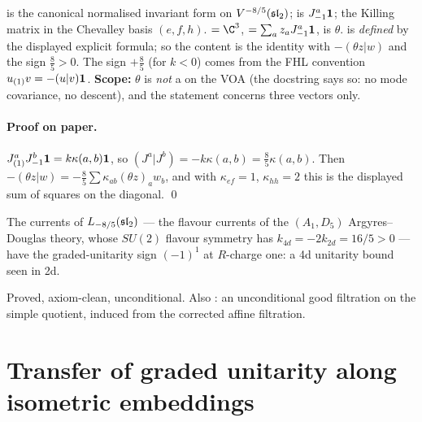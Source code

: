 \begin{dictionary}
 is the canonical normalised invariant form on $V^{-8/5}(\mathfrak{sl}_2)$;
 is $J^a_{-1}\mathbf{1}$;  the Killing matrix in the Chevalley basis
$(e,f,h)$.  $=\C^3$,  $= \sum_az_aJ^a_{-1}\mathbf{1}$,
 is $\theta$.  is \emph{defined} by the displayed
explicit formula; so the content is the identity with $-(\theta z|w)$ and the sign $\tfrac85>0$. The sign
$+\tfrac85$ (for $k<0$) comes from the FHL convention $u_{(1)}v = -(u|v)\mathbf{1}$. \textbf{Scope:} $\theta$ is
\emph{not} a  on the VOA (the docstring says so: no mode covariance, no descent), and the
statement concerns three vectors only.
\end{dictionary}

\paragraph{Proof on paper.} $J^a_{(1)}J^b_{-1}\mathbf{1} = k\kappa(a,b)\mathbf{1}$, so $(J^a|J^b) = -k\kappa(a,b) =
\tfrac85\kappa(a,b)$. Then $-(\theta z|w) = -\tfrac85\sum\kappa_{ab}(\theta z)_aw_b$, and with $\kappa_{ef} = 1$,
$\kappa_{hh} = 2$ this is the displayed sum of squares on the diagonal. \qed

\begin{physics}
The currents of $L_{-8/5}(\mathfrak{sl}_2)$ --- the flavour currents of the $(A_1,D_5)$ Argyres--Douglas theory, whose
$SU(2)$ flavour symmetry has $k_{4d} = -2k_{2d} = 16/5>0$ --- have the graded-unitarity sign $(-1)^1$ at
$R$-charge one: a 4d unitarity bound seen in 2d.
\end{physics}

\begin{status}
Proved, axiom-clean, unconditional. Also : an unconditional good
filtration on the simple quotient, induced from the corrected affine filtration.
\end{status}

\section{Transfer of graded unitarity along isometric embeddings}\label{l19:sec:transfer}

